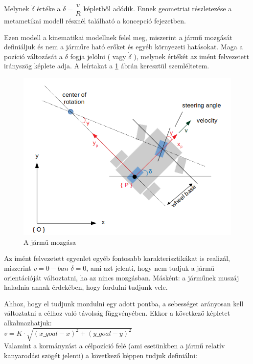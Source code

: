 Melynek $ \dot{\delta} $ értéke a $ \dot{\delta} = \dfrac{v}{R} $ képletből adódik. Ennek geometriai részletezése a metametikai modell résznél található a koncepció fejezetben. 

Ezen modell a kinematikai modellnek felel meg, miszerint a jármű mozgását definiáljuk és nem a járműre ható erőket és egyéb környezeti hatásokat. Maga a pozíció változását a $ \delta $ fogja jelölni ( vagy $ \dot{\delta} $ ), melynek értékét az imént felvezetett irányszög képlete adja. A leírtakat a \ref{fig:position} ábrán keresztül szemléltetem.\\

\begin{figure}[h!]
\centering
\includegraphics[scale=0.70]{images/position.png}
\caption{A jármű mozgása}
\label{fig:position}
\end{figure}

Az imént felvezetett egyenlet egyéb fontosabb karakterisztikákat is realizál, miszerint $ v  = 0-ban$ $ \delta = 0 $, ami azt jelenti, hogy nem tudjuk a jármű orientációját változtatni, ha az nincs mozgásban. Másként: a járműnek muszáj haladnia annak érdekében, hogy fordulni tudjunk vele. 

Ahhoz, hogy el tudjunk mozdulni egy adott pontba, a sebességet arányosan kell változtatni a célhoz való távolság függvényében. Ekkor a következő képletet alkalmazhatjuk:\\

$ v = K \cdot \sqrt{(x\_goal - x)^2 + (y\_goal - y) ^2}$ \\

Valamint a kormányzást a célpozíció felé (ami esetünkben a jármű relatív kanyarodási szögét jelenti) a következő képpen tudjuk definiálni:\\

